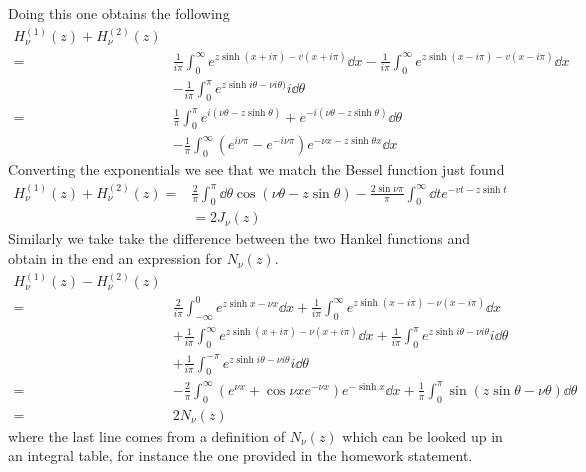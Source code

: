 \documentclass[a4paper,12pt]{article}
\begin{document}
Doing this one obtains the following
\begin{equation}
	\begin{aligned}
		H_\nu^{(1)}(z)+H_\nu^{(2)}(z)\\
		=&\frac{1}{i\pi}\int_{0}^{\infty}e^{z\sinh (x+i\pi)-v(x+i\pi)}\dd 
	x-\frac{1}{i\pi}\int_{0}^{\infty}e^{z\sinh (x-i\pi)-v(x-i\pi)}\dd x\\
&-\frac{1}{i\pi}\int_{0}^{\pi}e^{z\sinh i\theta -\nu i\theta)}i\dd \theta\\
	 =&\frac{1}{\pi}\int_0^\pi e^{i(\nu\theta-z\sinh\theta)}+e^{-i(\nu\theta-z\sinh\theta)}\dd \theta\\
	 &-\frac{1}{\pi}\int_0^\infty \left(e^{i\nu\pi}-e^{-i\nu\pi}\right)e^{-\nu x-z\sinh\theta x}\dd  x
	\end{aligned}
\end{equation}
Converting the exponentials we see that we match the Bessel function just found
\begin{equation}
	\begin{aligned}
		H_\nu^{(1)}(z)+H_\nu^{(2)}(z)=&\frac{2}{\pi} \int_0^\pi \dd \theta\cos(\nu\theta -z\sin\theta)
		-\frac{2\sin\nu\pi}{\pi} \int_0^\infty\dd t e^{-vt-z\sinh t}\\
		&=
		2J_\nu(z)
	\end{aligned}
\end{equation}
Similarly we take take the difference between the two Hankel functions and obtain in the end an expression for $N_\nu(z)$.
\begin{equation}
	\begin{aligned}
		H_\nu^{(1)}(z)-H_\nu^{(2)}(z)\\
		=&\frac{2}{i\pi}\int_{-\infty}^{0}e^{z\sinh x-\nu x}\dd 
		x+\frac{1}{i\pi}\int_{0}^{\infty}e^{z\sinh (x-i\pi)-\nu(x-i\pi)}\dd x\\
		&+\frac{1}{i\pi}\int_{0}^{\infty}e^{z\sinh (x+i\pi)-\nu(x+i\pi)}\dd x+\frac{1}{i\pi}\int_{0}^{\pi}e^{z\sinh i\theta -\nu i\theta}i\dd \theta\\
		&+\frac{1}{i\pi}\int_{0}^{-\pi}e^{z\sinh i\theta -\nu i\theta}i\dd \theta
		\\ 
		=&-\frac{2}{\pi}\int_{0}^{\infty}\left(e^{\nu x}+\cos{\nu x}e^{-\nu x}\right)e^{-\sinh x}\dd x+\frac{1}{\pi}\int_{0}^{\pi}\sin(z\sin\theta-\nu\theta)\dd \theta
		\\
		=& 2N_\nu(z)
	\end{aligned}
\end{equation}
where the last line comes from a definition of $N_\nu(z)$ which can be looked up in an integral table, for instance the one provided in the homework statement.
\end{document}
